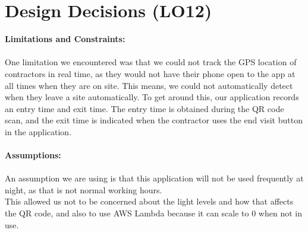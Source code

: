 \documentclass{article}
\begin{document}
\section{Design Decisions (LO12)}

\textbf{Limitations and Constraints:}\\
\\
One limitation we encountered was that we could not track the GPS location of contractors in real time, as they would not have
their phone open to the app at all times when they are on site. This means, we could not automatically detect when they leave a 
site automatically. To get around this, our application records an entry time and exit time. The entry time is obtained during
the QR code scan, and the exit time is indicated when the contractor uses the end visit button in the application.\\
\\
\textbf{Assumptions:}\\
\\
An assumption we are using is that this application will not be used frequently at night, as that is not normal working hours.\\
This allowed us not to be concerned about the light levels and how that affects the QR code, and also to use AWS Lambda because
it can scale to 0 when not in use.
\end{document}
